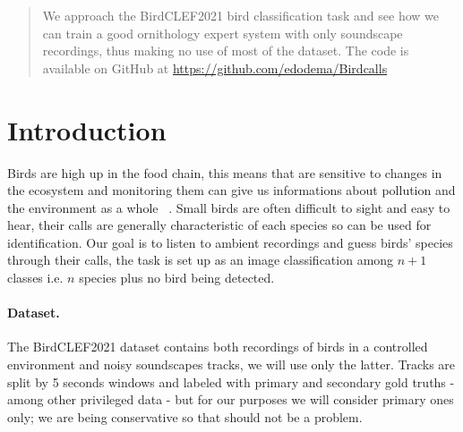 \documentclass{article}
\begin{document}

\printAffiliationsAndNotice{}

\begin{abstract}
We approach the BirdCLEF2021 bird classification task and see how we can train a good ornithology expert system with only soundscape recordings, thus making no use of most of the dataset.
The code is available on GitHub at \href{https://github.com/edodema/Birdcalls}{https://github.com/edodema/Birdcalls}
\end{abstract}

\section{Introduction}
Birds are high up in the food chain, this means that are sensitive to changes in the ecosystem and monitoring them can give us informations about pollution and the environment as a whole ~\cite{becker2003biomonitoring}.
Small birds are often difficult to sight and easy to hear, their calls are generally characteristic of each species so can be used for identification.
Our goal is to listen to ambient recordings and guess birds' species through their calls, the task is set up as an image classification among $n+1$ classes i.e. $n$ species plus no bird being detected. 

\paragraph*{Dataset.}
The BirdCLEF2021 dataset contains both recordings of birds in a controlled environment and noisy soundscapes tracks, we will use only the latter.
Tracks are split by 5 seconds  windows and labeled with primary and secondary gold truths - among other privileged data - but for our purposes we will consider primary ones only; we are being conservative so that should not be a problem.
\end{document}
